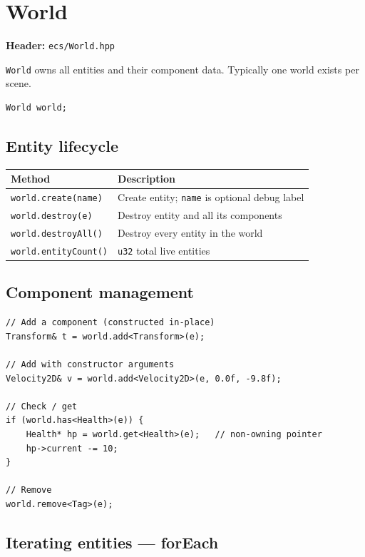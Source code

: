 \section{World}

\textbf{Header:} \texttt{ecs/World.hpp}

\texttt{World} owns all entities and their component data. Typically one
world exists per scene.

\begin{lstlisting}
World world;
\end{lstlisting}

\subsection{Entity lifecycle}

\begin{longtable}{ll}
\toprule
\textbf{Method} & \textbf{Description} \\
\midrule
\texttt{world.create(name)}   & Create entity; \texttt{name} is optional debug label \\
\texttt{world.destroy(e)}     & Destroy entity and all its components \\
\texttt{world.destroyAll()}   & Destroy every entity in the world \\
\texttt{world.entityCount()}  & \texttt{u32} total live entities \\
\bottomrule
\end{longtable}

\subsection{Component management}

\begin{lstlisting}
// Add a component (constructed in-place)
Transform& t = world.add<Transform>(e);

// Add with constructor arguments
Velocity2D& v = world.add<Velocity2D>(e, 0.0f, -9.8f);

// Check / get
if (world.has<Health>(e)) {
    Health* hp = world.get<Health>(e);   // non-owning pointer
    hp->current -= 10;
}

// Remove
world.remove<Tag>(e);
\end{lstlisting}

\subsection{Iterating entities — forEach}

